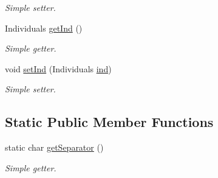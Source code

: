 \begin{DoxyCompactItemize}
\begin{DoxyCompactList}\small\item\em Simple setter. \end{DoxyCompactList}\item 
Individuals \hyperlink{class_ontology_1_1_ontology_a48a2d9c2ab89d1039f508c7deaee5b19}{getInd} ()
\begin{DoxyCompactList}\small\item\em Simple getter. \end{DoxyCompactList}\item 
void \hyperlink{class_ontology_1_1_ontology_ae4544b6a354a59abc8d92b5ed77365ef}{setInd} (Individuals \hyperlink{class_ontology_1_1_ontology_af8d92920b83a12fa85e86c9b8b606c2e}{ind})
\begin{DoxyCompactList}\small\item\em Simple setter. \end{DoxyCompactList}\end{DoxyCompactItemize}
\subsection*{Static Public Member Functions}
\begin{DoxyCompactItemize}
\item 
static char \hyperlink{class_ontology_1_1_ontology_adffaab20a43bbfbac43402980e47076a}{getSeparator} ()
\begin{DoxyCompactList}\small\item\em Simple getter. \end{DoxyCompactList}\end{DoxyCompactItemize}
